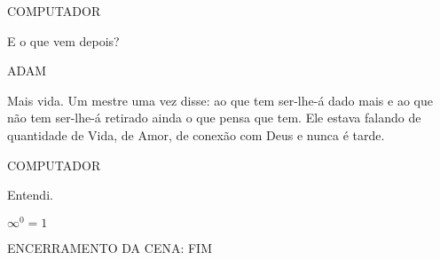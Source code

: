 COMPUTADOR

\emdash{}E o que vem depois?

ADAM

\emdash{}Mais vida. Um mestre uma vez disse: ao
que tem ser-lhe-á dado mais e ao que não
tem ser-lhe-á retirado ainda o que pensa
que tem. Ele estava falando de
quantidade de Vida, de Amor, de conexão
com Deus e nunca é tarde.

COMPUTADOR

\emdash{}Entendi.

\begin{center}
$\infty^0=1$    
\end{center}


ENCERRAMENTO DA CENA:
FIM